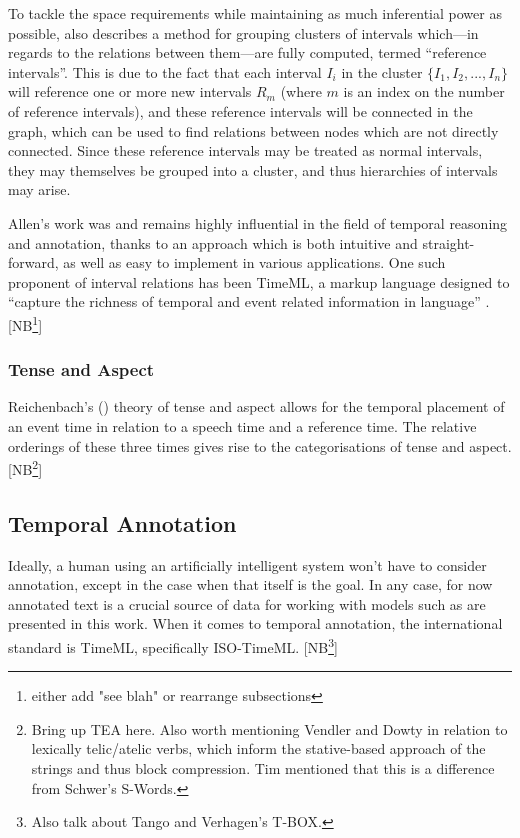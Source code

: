\documentclass[a4paper,12pt,leqno]{article}
\newcommand{\selfnote}[1]{{\color{red}[NB\footnote{{\color{red}#1}}]}}
\newcommand{\nb}{\selfnote}
\begin{document}
To tackle the space requirements while maintaining as much inferential power as possible, \citet[p. 838]{allen1983maintaining} also describes a method for grouping clusters of intervals which---in regards to the relations between them---are fully computed, termed ``reference intervals''. This is due to the fact that each interval $I_i$ in the cluster $\{I_1, I_2, ..., I_n\}$ will reference one or more new intervals $R_m$ (where $m$ is an index on the number of reference intervals), and these reference intervals will be connected in the graph, which can be used to find relations between nodes which are not directly connected. Since these reference intervals may be treated as normal intervals, they may themselves be grouped into a cluster, and thus hierarchies of intervals may arise.%

Allen's work was and remains highly influential in the field of temporal reasoning and annotation, thanks to an approach which is both intuitive and straight-forward, as well as easy to implement in various applications. One such proponent of interval relations has been TimeML, a markup language designed to ``capture the richness of temporal and event related information in language'' \citep[p. 123]{Pustejovsky2005}. \nb{either add "see blah" or rearrange subsections}


\subsubsection{Tense and Aspect}\label{ssub:tenseaspect}
Reichenbach's (\citeyear{reichenbach1947elements}) theory of tense and aspect allows for the temporal placement of an event time in relation to a speech time and a reference time. The relative orderings of these three times gives rise to the categorisations of tense and aspect. \selfnote{Bring up TEA here. Also worth mentioning Vendler and Dowty in relation to lexically telic/atelic verbs, which inform the stative-based approach of the strings and thus block compression. Tim mentioned that this is a difference from Schwer's S-Words.}
\subsection{Temporal Annotation}\label{sub:annotation}
Ideally, a human using an artificially intelligent system won't have to consider annotation, except in the case when that itself is the goal. In any case, for now annotated text is a crucial source of data for working with models such as are presented in this work. When it comes to temporal annotation, the international standard is TimeML, specifically ISO-TimeML. \selfnote{Also talk about Tango and Verhagen's T-BOX.}
\end{document}
